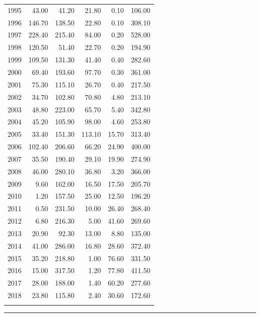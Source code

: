 \documentclass[12pt,]{article}
\begin{document}
\begin{longtable}{rrrrrr}
  1995 & 43.00 & 41.20 & 21.80 & 0.10 & 106.00 \\ 
  1996 & 146.70 & 138.50 & 22.80 & 0.10 & 308.10 \\ 
  1997 & 228.40 & 215.40 & 84.00 & 0.20 & 528.00 \\ 
  1998 & 120.50 & 51.40 & 22.70 & 0.20 & 194.90 \\ 
  1999 & 109.50 & 131.30 & 41.40 & 0.40 & 282.60 \\ 
  2000 & 69.40 & 193.60 & 97.70 & 0.30 & 361.00 \\ 
  2001 & 75.30 & 115.10 & 26.70 & 0.40 & 217.50 \\ 
  2002 & 34.70 & 102.80 & 70.80 & 4.80 & 213.10 \\ 
  2003 & 48.80 & 223.00 & 65.70 & 5.40 & 342.80 \\ 
  2004 & 45.20 & 105.90 & 98.00 & 4.60 & 253.80 \\ 
  2005 & 33.40 & 151.30 & 113.10 & 15.70 & 313.40 \\ 
  2006 & 102.40 & 206.60 & 66.20 & 24.90 & 400.00 \\ 
  2007 & 35.50 & 190.40 & 29.10 & 19.90 & 274.90 \\ 
  2008 & 46.00 & 280.10 & 36.80 & 3.20 & 366.00 \\ 
  2009 & 9.60 & 162.00 & 16.50 & 17.50 & 205.70 \\ 
  2010 & 1.20 & 157.50 & 25.00 & 12.50 & 196.20 \\ 
  2011 & 0.50 & 231.50 & 10.00 & 26.40 & 268.40 \\ 
  2012 & 6.80 & 216.30 & 5.00 & 41.60 & 269.60 \\ 
  2013 & 20.90 & 92.30 & 13.00 & 8.80 & 135.00 \\ 
  2014 & 41.00 & 286.00 & 16.80 & 28.60 & 372.40 \\ 
  2015 & 35.20 & 218.80 & 1.00 & 76.60 & 331.50 \\ 
  2016 & 15.00 & 317.50 & 1.20 & 77.80 & 411.50 \\ 
  2017 & 28.00 & 188.00 & 1.40 & 60.20 & 277.60 \\ 
  2018 & 23.80 & 115.80 & 2.40 & 30.60 & 172.60 \\ 
   \hline
\hline
\label{tab:Reconstructed_Landings_byState}
\end{longtable}

\begin{center}\rule{0.5\linewidth}{\linethickness}\end{center}

\FloatBarrier
\newpage
\end{document}
